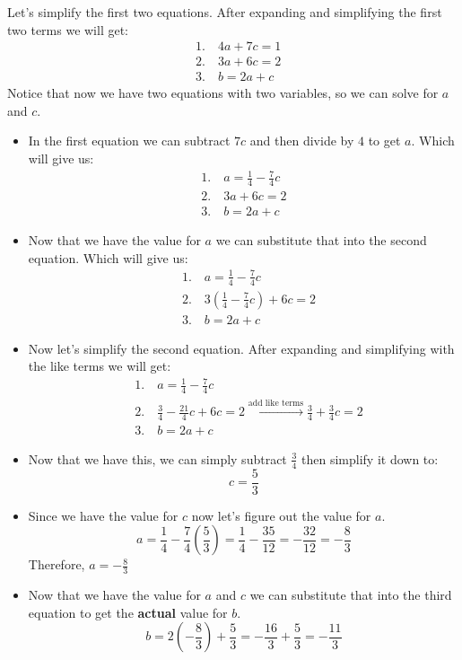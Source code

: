 Let's simplify the first two equations.
After expanding and simplifying the first two terms we will get:
\begin{align*}
    &1.\quad 4a + 7c = 1 \\
    &2.\quad 3a + 6c = 2 \\
    &3.\quad b = 2a + c      
\end{align*}
Notice that now we have two equations with two variables, so we can solve for $a$ and $c$.
\\ 

\begin{itemize}
    \item In the first equation we can subtract $7c$ and then divide by $4$ to get $a$. Which will give us: 
    \begin{align*}
        1. \quad  a = \frac{1}{4} - \frac{7}{4}c \\
        2. \quad 3a + 6c = 2 \\
        3. \quad b = 2a + c
    \end{align*}
    \item Now that we have the value for $a$ we can substitute that into the second equation. Which will give us:
    \begin{align*}
        &1. \quad a = \frac{1}{4} - \frac{7}{4}c \\
        &2. \quad 3(\frac{1}{4} - \frac{7}{4}c) + 6c = 2 \\
        &3. \quad b = 2a + c
    \end{align*}
    \item Now let's simplify the second equation. After expanding and simplifying with the like terms we will get:
    \begin{align*}
        &1. \quad a = \frac{1}{4} - \frac{7}{4}c \\
        &2. \quad \frac{3}{4} - \frac{21}{4}c + 6c = 2 \xrightarrow{\text{add like terms}} \frac{3}{4} + \frac{3}{4}c = 2\\
        &3. \quad b = 2a + c
    \end{align*}
    \item Now that we have this, we can simply subtract $\frac{3}{4}$ then simplify it down to: 
    $$ c = \frac{5}{3} $$ 
    \item Since we have the value for $c$ now let's figure out the value for $a$.
    $$ a = \frac{1}{4} - \frac{7}{4}(\frac{5}{3}) = \frac{1}{4} - \frac{35}{12} = - \frac{32}{12} = -\frac{8}{3}$$
    Therefore, $ a = - \frac{8}{3} $
    \item Now that we have the value for $a$ and $c$ we can substitute that into the third equation to get the \textbf{actual} value for $b$.
    $$ b = 2(-\frac{8}{3}) + \frac{5}{3} = -\frac{16}{3} + \frac{5}{3} = -\frac{11}{3}$$
\end{itemize}

